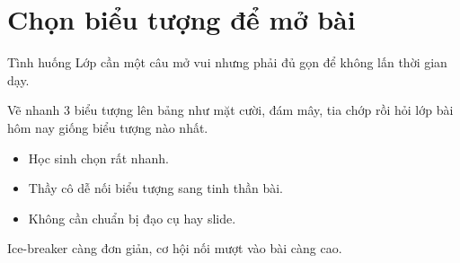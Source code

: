 \section{Chọn biểu tượng để mở bài}
\begin{tinhhuong}{Tình huống}
Lớp cần một câu mở vui nhưng phải đủ gọn để không lấn thời gian dạy.
\end{tinhhuong}
\begin{goiydungngay}
Vẽ nhanh 3 biểu tượng lên bảng như mặt cười, đám mây, tia chớp rồi hỏi lớp bài hôm nay giống biểu tượng nào nhất.
\begin{itemize}
\item Học sinh chọn rất nhanh.
\item Thầy cô dễ nối biểu tượng sang tinh thần bài.
\item Không cần chuẩn bị đạo cụ hay slide.
\end{itemize}
\end{goiydungngay}
\begin{cauchot}
Ice-breaker càng đơn giản, cơ hội nối mượt vào bài càng cao.
\end{cauchot}
